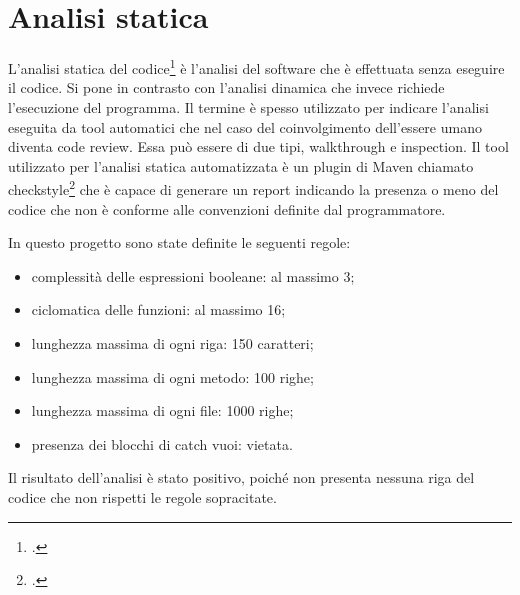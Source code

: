 \section{Analisi statica}\label{sec:analisi-statica}

L'analisi statica del codice\footcite{site:analisi_static} è l'analisi del software che è effettuata senza eseguire
il codice.
Si pone in contrasto con l'analisi dinamica che invece richiede l'esecuzione del
programma.
Il termine è spesso utilizzato per indicare l'analisi eseguita da tool
automatici che nel caso del coinvolgimento dell'essere umano diventa code review.
Essa può  essere di due tipi, \gls{walkthrough} e \gls{inspection}.
Il tool utilizzato per l'analisi statica automatizzata è un plugin di Maven
chiamato checkstyle\footcite{site:checkstyle} che è capace di generare un report indicando la presenza o
meno del codice che non è conforme alle convenzioni definite dal programmatore.

In questo progetto sono state definite le seguenti regole:
\begin{itemize}
    \item complessità delle espressioni booleane: al massimo 3;
    \item \gls{ciclomatica} delle funzioni: al massimo 16;
    \item lunghezza massima di ogni riga: 150 caratteri;
    \item lunghezza massima di ogni metodo: 100 righe;
    \item lunghezza massima di ogni file: 1000 righe;
    \item presenza dei blocchi di catch vuoi: vietata.
\end{itemize}

Il risultato dell'analisi è stato positivo, poiché non presenta nessuna riga del codice che non rispetti le regole sopracitate.